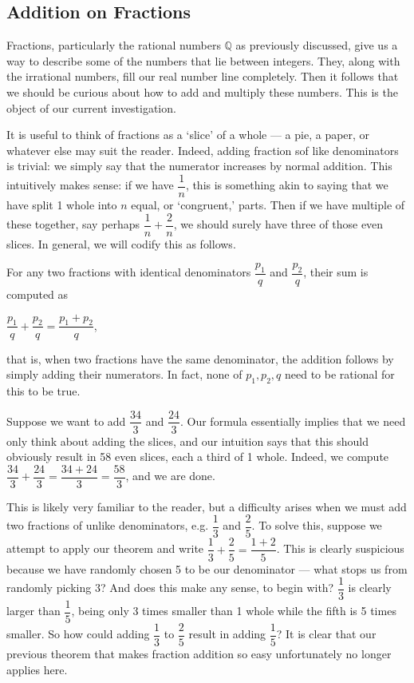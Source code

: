 \documentclass[openany]{book}
\begin{document}
\subsection{Addition on Fractions}
Fractions, particularly the rational numbers $\mathbb{Q}$ as previously discussed, give us a way to describe some of the numbers that lie between integers. They, along with the irrational numbers, fill our real number line completely. Then it follows that we should be curious about how to add and multiply these numbers. This is the object of our current investigation.\par
It is useful to think of fractions as a `slice' of a whole --- a pie, a paper, or whatever else may suit the reader. Indeed, adding fraction sof like denominators is trivial: we simply say that the numerator increases by normal addition. This intuitively makes sense: if we have $\dfrac{1}{n}$, this is something akin to saying that we have split 1 whole into $n$ equal, or `congruent,' parts. Then if we have multiple of these together, say perhaps $\dfrac{1}{n}+\dfrac{2}{n}$, we should surely have three of those even slices. In general, we will codify this as follows.
\begin{theorem}
	For any two fractions with identical denominators $\dfrac{p_{1}}{q}$ and $\dfrac{p_{2}}{q}$, their sum is computed as
	\begin{center}
		$\dfrac{p_{1}}{q}+\dfrac{p_{2}}{q} = \dfrac{p_{1}+p_{2}}{q}$,
	\end{center}
	that is, when two fractions have the same denominator, the addition follows by simply adding their numerators. In fact, none of $p_{1},p_{2},q$ need to be rational for this to be true.
\end{theorem}
\begin{example}
	Suppose we want to add $\dfrac{34}{3}$ and $\dfrac{24}{3}$. Our formula essentially implies that we need only think about adding the slices, and our intuition says that this should obviously result in 58 even slices, each a third of 1 whole. Indeed, we compute $\dfrac{34}{3}+\dfrac{24}{3}=\dfrac{34+24}{3}=\dfrac{58}{3}$, and we are done.
\end{example}
This is likely very familiar to the reader, but a difficulty arises when we must add two fractions of unlike denominators, e.g. $\dfrac{1}{3}$ and $\dfrac{2}{5}$. To solve this, suppose we attempt to apply our theorem and write $\dfrac{1}{3}+\dfrac{2}{5}=\dfrac{1+2}{5}$. This is clearly suspicious because we have randomly chosen 5 to be our denominator --- what stops us from randomly picking 3? And does this make any sense, to begin with? $\dfrac{1}{3}$ is clearly larger than $\dfrac{1}{5}$, being only 3 times smaller than 1 whole while the fifth is 5 times smaller. So how could adding $\dfrac{1}{3}$ to $\dfrac{2}{5}$ result in adding $\dfrac{1}{5}$? It is clear that our previous theorem that makes fraction addition so easy unfortunately no longer applies here.\par
\end{document}
